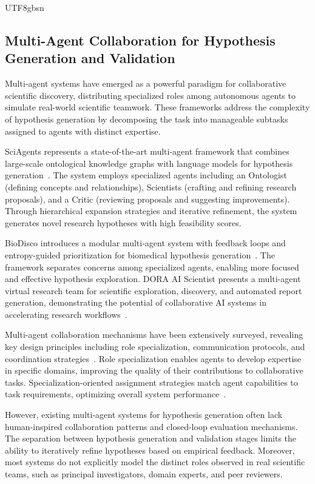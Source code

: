 \documentclass[11pt]{article}
\begin{document}
\begin{CJK}{UTF8}{gbsn}
\subsection{Multi-Agent Collaboration for Hypothesis Generation and Validation}

Multi-agent systems have emerged as a powerful paradigm for collaborative scientific discovery, distributing specialized roles among autonomous agents to simulate real-world scientific teamwork. These frameworks address the complexity of hypothesis generation by decomposing the task into manageable subtasks assigned to agents with distinct expertise.

SciAgents represents a state-of-the-art multi-agent framework that combines large-scale ontological knowledge graphs with language models for hypothesis generation~\cite{ghafarollahi2025sciagents}. The system employs specialized agents including an Ontologist (defining concepts and relationships), Scientists (crafting and refining research proposals), and a Critic (reviewing proposals and suggesting improvements). Through hierarchical expansion strategies and iterative refinement, the system generates novel research hypotheses with high feasibility scores.

BioDisco introduces a modular multi-agent system with feedback loops and entropy-guided prioritization for biomedical hypothesis generation~\cite{ke2025biodisco}. The framework separates concerns among specialized agents, enabling more focused and effective hypothesis exploration. DORA AI Scientist presents a multi-agent virtual research team for scientific exploration, discovery, and automated report generation, demonstrating the potential of collaborative AI systems in accelerating research workflows~\cite{naumov2025dora}.

Multi-agent collaboration mechanisms have been extensively surveyed, revealing key design principles including role specialization, communication protocols, and coordination strategies~\cite{tran2025multiagent,lin2025survey}. Role specialization enables agents to develop expertise in specific domains, improving the quality of their contributions to collaborative tasks. Specialization-oriented assignment strategies match agent capabilities to task requirements, optimizing overall system performance~\cite{lin2025survey}.

However, existing multi-agent systems for hypothesis generation often lack human-inspired collaboration patterns and closed-loop evaluation mechanisms. The separation between hypothesis generation and validation stages limits the ability to iteratively refine hypotheses based on empirical feedback. Moreover, most systems do not explicitly model the distinct roles observed in real scientific teams, such as principal investigators, domain experts, and peer reviewers.


\end{CJK}
\end{document}
